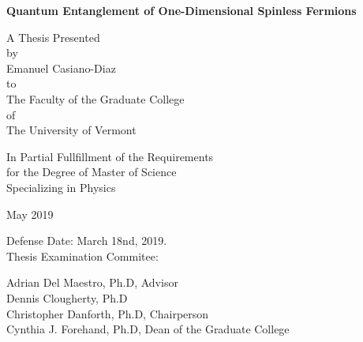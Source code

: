 \documentclass[12pt, two sided]{report}
\begin{document}
\begin{titlepage}
	\begin{center}
		\vspace*{1cm}
				
		\Large
		\textbf{Quantum Entanglement of One-Dimensional Spinless Fermions}
		
		\vspace{0.9cm}
		
		
		\normalsize
		A Thesis Presented \\
		\vspace{0.4cm}
		by \\
		\vspace{0.4cm}
		Emanuel Casiano-Diaz \\
		\vspace{0.4cm}
		to \\
		\vspace{0.4cm}
		The Faculty of the Graduate College \\
		\vspace{0.4cm}
		of \\
		\vspace{0.4cm}
		The University of Vermont
		
		\vspace{0.7cm}

	
		In Partial Fullfillment of the Requirements \\
		for the Degree of Master of Science \\
		Specializing in Physics	
			
		\vspace{0.5cm}
		
		May 2019
		
	\end{center}
	
	\vspace{0.1cm}
	
	\begin{flushright}
		Defense Date: March 18nd, 2019. \\
		Thesis Examination Commitee:
		
		\vspace{0.15cm}
		
		Adrian Del Maestro, Ph.D, Advisor \\
		Dennis Clougherty, Ph.D \\
		Christopher Danforth, Ph.D, Chairperson \\
		Cynthia J. Forehand, Ph.D, Dean of the Graduate College
		
	
	\end{flushright}
\end{titlepage}
\end{document}
